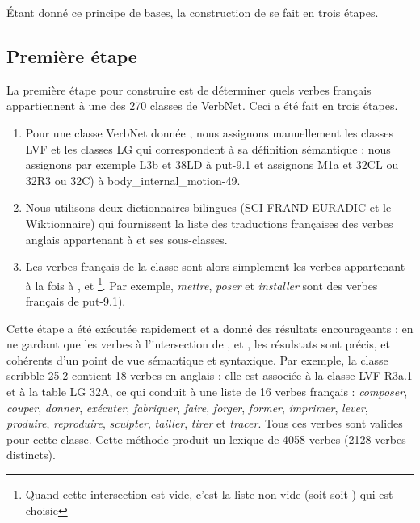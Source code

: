 Étant donné ce principe de bases, la construction de \verbenet{} se fait en
trois étapes.

\subsection{Première étape}\label{first}

La première étape pour construire \verbenet{} est de déterminer quels verbes
français appartiennent à une des 270 classes de VerbNet. Ceci a été fait en
trois étapes.

\begin{enumerate}

    \item Pour une classe VerbNet donnée \Ce{}, nous assignons manuellement les
        classes LVF \Clvf{} et les classes LG \Clg{} qui correspondent à sa
        définition sémantique : nous assignons par exemple {\color{red}L3b} et
        {\color{green}38LD} à {\color{blue}put-9.1} et assignons
        {\color{red}M1a} et {\color{green}32CL ou 32R3 ou 32C}) à
        {\color{blue}body\_internal\_motion-49}.

    \item Nous utilisons deux dictionnaires bilingues (SCI-FRAND-EURADIC et le
        Wiktionnaire) qui fournissent la liste \Ltrad{} des traductions
        françaises des verbes anglais appartenant à \Ce{} et ses sous-classes.

    \item Les verbes français de la classe \Ce{} sont alors simplement les
        verbes appartenant à la fois à \Ltrad{}, \Clvf{} et
        \Clg{}\footnote{Quand cette intersection est vide, c'est la liste
        non-vide (soit \Clvf{} soit \Clg{}) qui est choisie}. Par exemple,
        \emph{mettre}, \emph{poser} et \emph{installer} sont des verbes
        français de {\color{blue}put-9.1}).

\end{enumerate}

Cette étape a été exécutée rapidement et a donné des résultats encourageants :
en ne gardant que les verbes à l'intersection de \Ltrad{}, \Clvf{} et \Clg{},
les résulstats sont précis, et cohérents d'un point de vue sémantique et
syntaxique. Par exemple, la classe {\color{blue}scribble-25.2} contient 18
verbes en anglais : elle est associée à la classe LVF {\color{red}R3a.1} et à
la table LG {\color{green}32A}, ce qui conduit à une liste de 16 verbes
français : \emph{composer}, \emph{couper}, \emph{donner}, \emph{exécuter},
\emph{fabriquer}, \emph{faire}, \emph{forger}, \emph{former}, \emph{imprimer},
\emph{lever}, \emph{produire}, \emph{reproduire}, \emph{sculpter},
\emph{tailler}, \emph{tirer} et \emph{tracer}. Tous ces verbes sont valides
pour cette classe.  Cette méthode produit un lexique de 4058 verbes (2128
verbes distincts).

